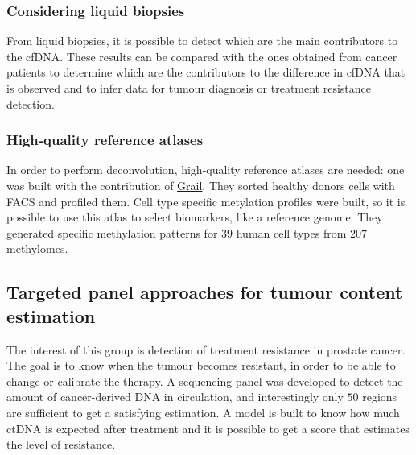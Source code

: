         \subsubsection{Considering liquid biopsies}
        From liquid biopsies, it is possible to detect which are the main contributors to the cfDNA.
        These results can be compared with the ones obtained from cancer patients to determine which are the contributors to the difference in cfDNA that is observed and to infer data for tumour diagnosis or treatment resistance detection.

        \subsubsection{High-quality reference atlases}
        In order to perform deconvolution, high-quality reference atlases are needed: one was built with the contribution of \href{https://www.biorxiv.org/content/10.1101/2022.01.24.477547v1}{Grail}.
        They sorted healthy donors cells with FACS and profiled them.
        Cell type specific metylation profiles were built, so it is possible to use this atlas to select biomarkers, like a reference genome.
        They generated specific methylation patterns for $39$ human cell types from $207$ methylomes.

    \subsection{Targeted panel approaches for tumour content estimation}
    The interest of this group is detection of treatment resistance in prostate cancer.
    The goal is to know when the tumour becomes resistant, in order to be able to change or calibrate the therapy.
    A sequencing panel was developed to detect the amount of cancer-derived DNA in circulation, and interestingly only $50$ regions are sufficient to get a satisfying estimation.
    A model is built to know how much ctDNA is expected after treatment and it is possible to get a score that estimates the level of resistance.

